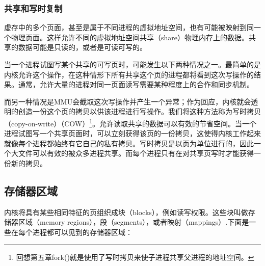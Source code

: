 \subsubsection{共享和写时复制}

虚存中的多个页面，甚至是属于不同进程的虚拟地址空间，也有可能被映射到同一个物理页面。这样允许不同的虚拟地址空间共享（share）物理内存上的数据。共享的数据可能是只读的，或者是可读可写的。

当一个进程试图写某个共享的可写页时，可能发生以下两种情况之一。最简单的是内核允许这个操作，在这种情形下所有共享这个页的进程都将看到这次写操作的结果。通常，允许大量的进程对同一页面读写需要某种程度上的合作和同步机制。

而另一种情况是MMU会截取这次写操作并产生一个异常；作为回应，内核就会透明的创造一份这个页的拷贝以供该进程进行写操作。我们将这种方法称为写时拷贝（copy-on-write）（COW）\footnote[1]{回想第五章fork()就是使用了写时拷贝来使子进程共享父进程的地址空间。}。允许读取共享的数据可以有效的节省空间。当一个进程试图写一个共享页面时，可以立刻获得该页的一份拷贝，这使得内核工作起来就像每个进程都始终有它自己的私有拷贝。写时拷贝是以页为单位进行的，因此一个大文件可以有效的被众多进程共享。而每个进程只有在对共享页写时才能获得一份新的拷贝。 

\subsection{存储器区域}

内核将具有某些相同特征的页组织成块（blocks），例如读写权限。这些块叫做存储器区域（memory regions），段（segments），或者映射（mappings）.下面是一些在每个进程都可以见到的存储器区域： 


